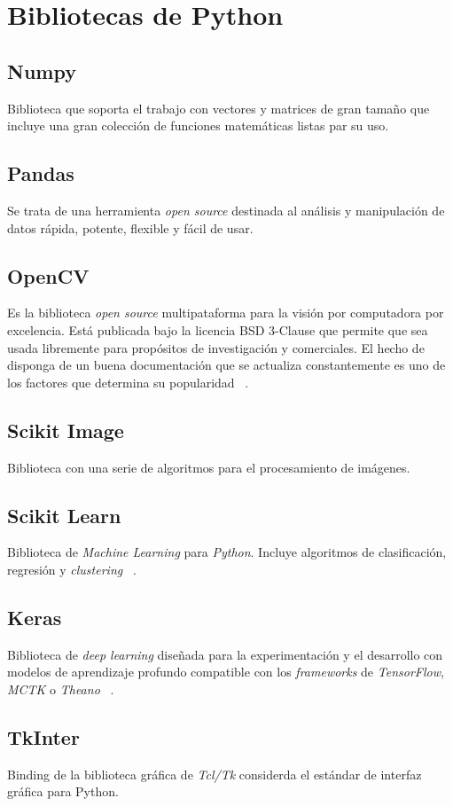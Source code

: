 \section{Bibliotecas de Python}
\subsection{Numpy}
Biblioteca que soporta el trabajo con vectores y matrices de gran tamaño que incluye una gran colección de funciones matemáticas listas par su uso.
\subsection{Pandas}
Se trata de una herramienta \emph{open source} destinada al análisis y manipulación de datos rápida, potente, flexible y fácil de usar.

\subsection{OpenCV}
Es la biblioteca \emph{open source} multipataforma para la visión por computadora por excelencia. Está publicada bajo la licencia BSD 3-Clause que permite que sea usada libremente para propósitos de investigación y comerciales. El hecho de disponga de un buena documentación que se actualiza constantemente es uno de los factores que determina su popularidad ~\cite{wiki:opencv}.

\subsection{Scikit Image}
Biblioteca con una serie de algoritmos para el procesamiento de imágenes.
\subsection{Scikit Learn}
Biblioteca de \emph{Machine Learning} para \emph{Python}. Incluye algoritmos de clasificación, regresión y \emph{clustering} ~\cite{wiki:sklearn}.

\subsection{Keras}
Biblioteca de \emph{deep learning} diseñada para la experimentación y el desarrollo con modelos de aprendizaje profundo compatible con los \emph{frameworks} de \emph{TensorFlow}, \emph{MCTK} o \emph{Theano} ~\cite{wiki:keras}.

\subsection{TkInter}
Binding de la biblioteca gráfica de \emph{Tcl/Tk} considerda el estándar de interfaz gráfica para Python.

